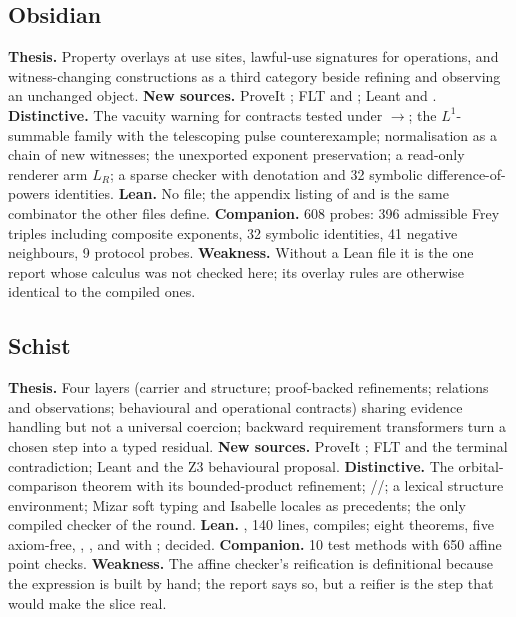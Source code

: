 \subsection*{Obsidian}
\textbf{Thesis.} Property overlays at use sites, lawful-use signatures for operations, and witness-changing constructions as a third category beside refining and observing an unchanged object. \textbf{New sources.} ProveIt ; FLT  and ; Leant  and . \textbf{Distinctive.} The vacuity warning for contracts tested under $\to$; the $L^1$-summable family with the telescoping pulse counterexample; normalisation as a chain of new witnesses; the unexported exponent preservation; a read-only renderer arm $L_R$; a sparse checker with denotation and 32 symbolic difference-of-powers identities. \textbf{Lean.} No file; the appendix listing of  and  is the same combinator the other files define. \textbf{Companion.} 608 probes: 396 admissible Frey triples including composite exponents, 32 symbolic identities, 41 negative neighbours, 9 protocol probes. \textbf{Weakness.} Without a Lean file it is the one report whose calculus was not checked here; its overlay rules are otherwise identical to the compiled ones.

\subsection*{Schist}
\textbf{Thesis.} Four layers (carrier and structure; proof-backed refinements; relations and observations; behavioural and operational contracts) sharing evidence handling but not a universal coercion; backward requirement transformers turn a chosen step into a typed residual. \textbf{New sources.} ProveIt ; FLT  and the terminal contradiction; Leant  and the Z3 behavioural proposal. \textbf{Distinctive.} The orbital-comparison theorem with its bounded-product refinement; //; a lexical structure environment; Mizar soft typing and Isabelle locales as precedents; the only compiled checker of the round. \textbf{Lean.} , 140 lines, compiles; eight theorems, five axiom-free, , , and  with ;  decided. \textbf{Companion.} 10 test methods with 650 affine point checks. \textbf{Weakness.} The affine checker's reification is definitional because the expression is built by hand; the report says so, but a reifier is the step that would make the slice real.

